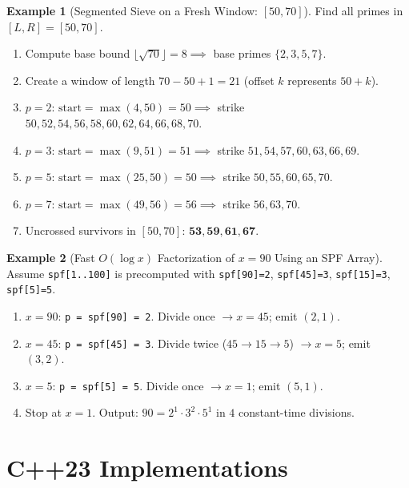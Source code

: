 \documentclass[11pt,a4paper]{article}
\theoremstyle{definition}
\newtheorem{example}{Example}[section]
\begin{document}
\begin{example}[Segmented Sieve on a Fresh Window: {$[50, 70]$}]
Find all primes in $[L, R] = [50, 70]$.
\begin{enumerate}
    \item Compute base bound $\lfloor \sqrt{70} \rfloor = 8 \implies$ base primes $\{2, 3, 5, 7\}$.
    \item Create a window of length $70 - 50 + 1 = 21$ (offset $k$ represents $50 + k$).
    \item $p = 2$: $\text{start} = \max(4, 50) = 50 \implies$ strike $50, 52, 54, 56, 58, 60, 62, 64, 66, 68, 70$.
    \item $p = 3$: $\text{start} = \max(9, 51) = 51 \implies$ strike $51, 54, 57, 60, 63, 66, 69$.
    \item $p = 5$: $\text{start} = \max(25, 50) = 50 \implies$ strike $50, 55, 60, 65, 70$.
    \item $p = 7$: $\text{start} = \max(49, 56) = 56 \implies$ strike $56, 63, 70$.
    \item Uncrossed survivors in $[50, 70]$: $\mathbf{53, 59, 61, 67}$.
\end{enumerate}
\end{example}

\begin{example}[Fast $O(\log x)$ Factorization of $x = 90$ Using an SPF Array]
Assume \texttt{spf[1..100]} is precomputed with \texttt{spf[90]=2}, \texttt{spf[45]=3}, \texttt{spf[15]=3}, \texttt{spf[5]=5}.
\begin{enumerate}
    \item $x = 90$: \texttt{p = spf[90] = 2}. Divide once $\to x = 45$; emit $(2, 1)$.
    \item $x = 45$: \texttt{p = spf[45] = 3}. Divide twice ($45 \to 15 \to 5$) $\to x = 5$; emit $(3, 2)$.
    \item $x = 5$: \texttt{p = spf[5] = 5}. Divide once $\to x = 1$; emit $(5, 1)$.
    \item Stop at $x = 1$. Output: $90 = 2^1 \cdot 3^2 \cdot 5^1$ in $4$ constant-time divisions.
\end{enumerate}
\end{example}

\section{C++23 Implementations}
\end{document}
